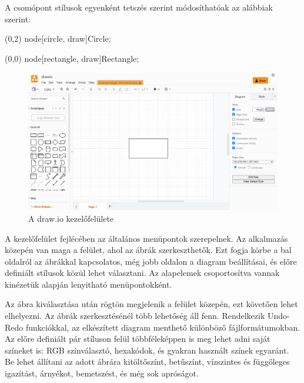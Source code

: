 A csomópont stílusok egyenként tetszés szerint módosíthatóak az alábbiak szerint:

\begin{tikzcode}
\draw (0,2) node[circle, draw]{Circle};



\draw (0,0) node[rectangle, draw]{Rectangle}; 
\end{tikzcode}





\begin{figure}[!h]
	\includegraphics[width=\textwidth]{images/drawio.png}
	\caption{A draw.io kezelőfelülete \cite{drawio}}
\label{fig:drawio}
\end{figure}

A kezelőfelület fejlécében az általános menüpontok szerepelnek. Az alkalmazás közepén van maga a felület, ahol az ábrák szerkeszthetők. Ezt fogja körbe a bal oldalról az ábrákkal kapcsolatos, még jobb oldalon a diagram beállításai, és előre definiált stílusok közül lehet választani. Az alapelemek csoportosítva vannak kinézetük alapján lenyitható menüpontokként. 

Az ábra kiválasztása után rögtön megjelenik a felület közepén, ezt követően lehet elhelyezni. Az ábrák szerkesztésénél több lehetőség áll fenn. Rendelkezik Undo-Redo funkciókkal, az elkészített diagram menthető különböző fájlformátumokban. Az előre definiált pár stíluson felül többféleképpen is meg lehet adni saját színeket is: RGB színválasztó, hexakódok, és gyakran használt színek egyaránt. Be lehet állítani az adott ábrára kitöltőszínt, betűszínt, vízszintes és függőleges igazítást, árnyékot, bemetszést, és még sok apróságot. 

